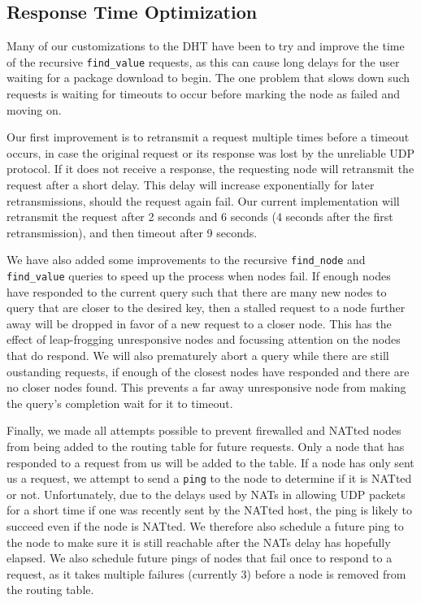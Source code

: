 \documentclass[conference]{IEEEtran}
\begin{document}
\subsection{Response Time Optimization}
\label{response_time}

Many of our customizations to the DHT have been to try and improve
the time of the recursive \texttt{find\_value} requests, as this can
cause long delays for the user waiting for a package download to
begin. The one problem that slows down such requests is waiting for
timeouts to occur before marking the node as failed and moving on.

Our first improvement is to retransmit a request multiple times
before a timeout occurs, in case the original request or its
response was lost by the unreliable UDP protocol. If it does not
receive a response, the requesting node will retransmit the request
after a short delay. This delay will increase exponentially for
later retransmissions, should the request again fail. Our current
implementation will retransmit the request after 2 seconds and 6
seconds (4 seconds after the first retransmission), and then timeout
after 9 seconds.

We have also added some improvements to the recursive
\texttt{find\_node} and \texttt{find\_value} queries to speed up the
process when nodes fail. If enough nodes have responded to the
current query such that there are many new nodes to query that are
closer to the desired key, then a stalled request to a node further
away will be dropped in favor of a new request to a closer node.
This has the effect of leap-frogging unresponsive nodes and
focussing attention on the nodes that do respond. We will also
prematurely abort a query while there are still oustanding requests,
if enough of the closest nodes have responded and there are no
closer nodes found. This prevents a far away unresponsive node from
making the query's completion wait for it to timeout.

Finally, we made all attempts possible to prevent firewalled and
NATted nodes from being added to the routing table for future
requests. Only a node that has responded to a request from us will
be added to the table. If a node has only sent us a request, we
attempt to send a \texttt{ping} to the node to determine if it is
NATted or not. Unfortunately, due to the delays used by NATs in
allowing UDP packets for a short time if one was recently sent by
the NATted host, the ping is likely to succeed even if the node is
NATted. We therefore also schedule a future ping to the node to make
sure it is still reachable after the NATs delay has hopefully
elapsed. We also schedule future pings of nodes that fail once to
respond to a request, as it takes multiple failures (currently 3)
before a node is removed from the routing table.
\end{document}
